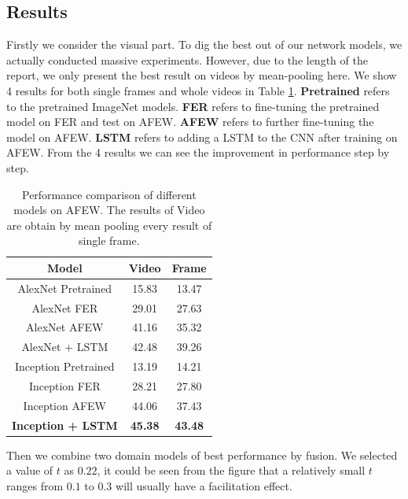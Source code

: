 \documentclass[10pt,twocolumn,letterpaper]{article}
\begin{document}
\subsection{Results}

Firstly we consider the visual part. To dig the best out of our network models, we actually conducted massive experiments. However, due to the length of the report, we only present the best result on videos by mean-pooling here. We show 4 results for both single frames and whole videos in Table \ref{tableResult}. \textbf{Pretrained} refers to the pretrained ImageNet models. \textbf{FER} refers to fine-tuning the pretrained model on FER and test on AFEW. \textbf{AFEW} refers to further fine-tuning the model on AFEW. \textbf{LSTM} refers to adding a LSTM to the CNN after training on AFEW. From the 4 results we can see the improvement in performance step by step.



\begin{table}[t]
\begin{center}
\begin{tabular}{|c|c|c|}
\hline
\textbf{Model} & \textbf{Video} & \textbf{Frame} \\
\hline\hline
AlexNet Pretrained & 15.83 & 13.47 \\
AlexNet FER & 29.01 & 27.63 \\
AlexNet AFEW & 41.16 &  35.32 \\
AlexNet + LSTM & 42.48 & 39.26  \\ 
\hline \hline 
Inception Pretrained & 13.19 & 14.21 \\
Inception FER & 28.21 & 27.80 \\
Inception AFEW & 44.06 & 37.43 \\
\textbf{Inception + LSTM} & \textbf{45.38} & \textbf{43.48} \\



\hline
\end{tabular}
\end{center}
\caption{Performance comparison of different models on AFEW. The results of Video are obtain by mean pooling every result of single frame.}
\label{tableResult}

\end{table}

Then we combine two domain models of best performance by fusion. We selected a value of $t$ as $0.22$, it could be seen from the figure that a relatively small $t$ ranges from $0.1$ to $0.3$ will usually have a facilitation effect.
\end{document}
